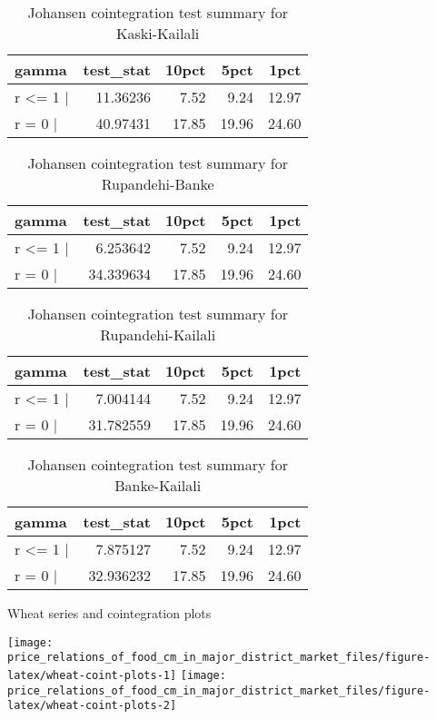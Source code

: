 \documentclass[
  12pt,
]{article}
\begin{document}
\begin{longtable}[t]{lrrrr}
\caption{\label{tab:wheat-cajo-test}Johansen cointegration test summary for Kaski-Kailali}\\
\toprule
gamma & test\_stat & 10pct & 5pct & 1pct\\
\midrule
r <= 1 | & 11.36236 & 7.52 & 9.24 & 12.97\\
r = 0  | & 40.97431 & 17.85 & 19.96 & 24.60\\
\bottomrule
\end{longtable}

\begin{longtable}[t]{lrrrr}
\caption{\label{tab:wheat-cajo-test}Johansen cointegration test summary for Rupandehi-Banke}\\
\toprule
gamma & test\_stat & 10pct & 5pct & 1pct\\
\midrule
r <= 1 | & 6.253642 & 7.52 & 9.24 & 12.97\\
r = 0  | & 34.339634 & 17.85 & 19.96 & 24.60\\
\bottomrule
\end{longtable}

\begin{longtable}[t]{lrrrr}
\caption{\label{tab:wheat-cajo-test}Johansen cointegration test summary for Rupandehi-Kailali}\\
\toprule
gamma & test\_stat & 10pct & 5pct & 1pct\\
\midrule
r <= 1 | & 7.004144 & 7.52 & 9.24 & 12.97\\
r = 0  | & 31.782559 & 17.85 & 19.96 & 24.60\\
\bottomrule
\end{longtable}

\begin{longtable}[t]{lrrrr}
\caption{\label{tab:wheat-cajo-test}Johansen cointegration test summary for Banke-Kailali}\\
\toprule
gamma & test\_stat & 10pct & 5pct & 1pct\\
\midrule
r <= 1 | & 7.875127 & 7.52 & 9.24 & 12.97\\
r = 0  | & 32.936232 & 17.85 & 19.96 & 24.60\\
\bottomrule
\end{longtable}

Wheat series and cointegration plots

\begin{center}\texttt{[image: price\_relations\_of\_food\_cm\_in\_major\_district\_market\_files/figure-latex/wheat-coint-plots-1]} \texttt{[image: price\_relations\_of\_food\_cm\_in\_major\_district\_market\_files/figure-latex/wheat-coint-plots-2]} \end{center}
\end{document}
